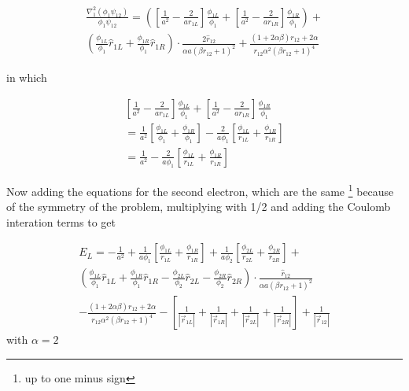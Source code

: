 \documentclass{article}
\begin{document}
\begin{multline}
\frac{\nabla_1^2(\phi_1\psi_{12})}{\phi_1 \psi_{12}} 
 = \left( \left[\frac{1}{a^2}-\frac{2}{ar_{1L}} \right] \frac{\phi_{1L}}{\phi_1} + \left[\frac{1}{a^2} - \frac{2}{ar_{1R}} \right] \frac{\phi_{1R}}{\phi_1}   \right)   
 + \\ \left(  \frac{\phi_{1L}}{\phi_1}\hat{r}_{1L} +\frac{\phi_{1R}}{\phi_1}\hat{r}_{1R} \right) \cdot \frac{2\hat{r}_{12}}{\alpha a(\beta r_{12}+1)^2}+    \frac{(1+2\alpha \beta) r_{12} 
 + 2\alpha}{r_{12}\alpha^2(\beta r_{12}+1)^4} 
\end{multline}

in which 

\begin{multline}
   \left[\frac{1}{a^2}-\frac{2}{a{r}_{1L}} \right] \frac{\phi_{1L}}{\phi_1} + \left[\frac{1}{a^2} - \frac{2}{a{r}_{1R}} \right] \frac{\phi_{1R}}{\phi_1}   \\ = \frac{1}{a^2} \left[ \frac{\phi_{1L}}{\phi_1} + \frac{\phi_{1R}}{\phi_1} \right]-\frac{2}{a\phi_1}\left[ \frac{\phi_{1L}}{r_{1L}}+\frac{\phi_{1R}}{r_{1R}} \right] \\ = \frac{1}{a^2} -\frac{2}{a\phi_1}\left[ \frac{\phi_{1L}}{r_{1L}}+\frac{\phi_{1R}}{r_{1R}} \right]
\end{multline}

Now adding the equations for the second electron, which are the same \footnote{up to one minus sign} because of the symmetry of the problem, multiplying with 1/2 and adding the Coulomb interation terms to get

\begin{multline}%
 E_L = -\frac{1}{a^2} +\frac{1}{a\phi_1}\left[ \frac{\phi_{1L}}{r_{1L}}+\frac{\phi_{1R}}{r_{1R}} \right] + \frac{1}{a\phi_2} \left[ \frac{\phi_{2L}}{r_{2L}}+\frac{\phi_{2R}}{r_{2R}}\right]
 + \\ \left(  \frac{\phi_{1L}}{\phi_1}\hat{r}_{1L} +\frac{\phi_{1R}}{\phi_1}\hat{r}_{1R}   -   \frac{\phi_{2L}}{\phi_2}\hat{r}_{2L} -\frac{\phi_{2R}}{\phi_2}\hat{r}_{2R}     \right)  \cdot \frac{\hat{r}_{12}}{\alpha a(\beta r_{12}+1)^2} \\
  -   \frac{(1+2\alpha \beta) r_{12} + 2\alpha}{r_{12}\alpha^2(\beta r_{12}+1)^4} 
  - \left[ \frac{1}{|\vec{r}_{1L}|} +\frac{1}{|\vec{r}_{1R}|}+\frac{1}{|\vec{r}_{2L}|}+\frac{1}{|\vec{r}_{2R}|} \right] +\frac{1}{\left| \vec{r}_{12} \right|} 
\end{multline}
with $\alpha=2$
\end{document}
